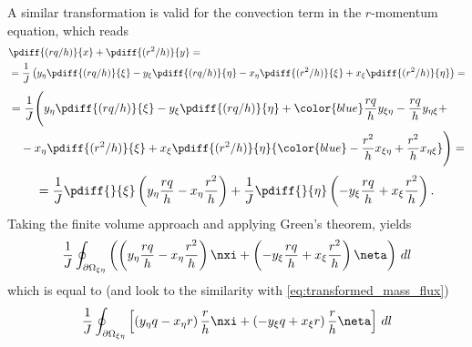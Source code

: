 A similar transformation is valid for the convection term in the $r$-momentum equation, which reads
\begin{align}
    &\pdiff{(rq/h)}{x} + \pdiff{(r^2/h)}{y} =
\\
    &= \frac{1}{J} \left(y_{\eta} \pdiff{(rq/h)}{\xi} - y_{\xi} \pdiff{(rq/h)}{\eta} -x_{\eta} \pdiff{(r^2/h)}{\xi} + x_{\xi} \pdiff{(r^2/h)}{\eta}\right) =
    \label{eq:eta_convection_term_1}
\end{align}
\begin{align}
    \begin{aligned}
        &= \frac{1}{J} \Bigg(y_{\eta} \pdiff{(rq/h)}{\xi} - y_{\xi} \pdiff{(rq/h)}{\eta} + {\color{blue}\frac{rq}{h}  y_{\xi\eta} - \frac{rq}{h} y_{\eta\xi}} +  \\
        &\quad -x_{\eta} \pdiff{(r^2/h)}{\xi} + x_{\xi} \pdiff{(r^2/h)}{\eta} {\color{blue} - \frac{r^2}{h}  x_{\xi\eta} + \frac{r^2}{h} x_{\eta\xi}} \Bigg) =
    \end{aligned}
\end{align}
\begin{align}
    = \frac{1}{J} \pdiff{}{\xi}\left(y_{\eta} \frac{rq}{h} - x_{\eta} \frac{r^2}{h} \right) + \frac{1}{J} \pdiff{}{\eta}\left(-y_{\xi} \frac{rq}{h} + x_{\xi} \frac{r^2}{h} \right).
    \label{eq:eta_convection_term}
\end{align}
Taking the finite volume approach and applying Green's theorem, yields
\begin{align}
    \frac{1}{J}\oint_{\partial\Omega_{\xi\eta}} \left(
    \left(y_{\eta} \frac{rq}{h} - x_{\eta} \frac{r^2}{h} \right) \nxi
    + \left(-y_{\xi} \frac{rq}{h} + x_{\xi} \frac{r^2}{h} \right) \neta
     \right)
    \, dl
\end{align}
which is equal to (and look to the similarity with \autoref{eq:transformed_mass_flux})
\begin{align}
    \frac{1}{J}\oint_{\partial\Omega_{\xi\eta}} \left[
    \left(y_{\eta} q - x_{\eta} r \right)\frac{r}{h} \nxi
    + \left(-y_{\xi} q + x_{\xi} r \right)\frac{r}{h} \neta
    \right]
    \, dl
\end{align}
